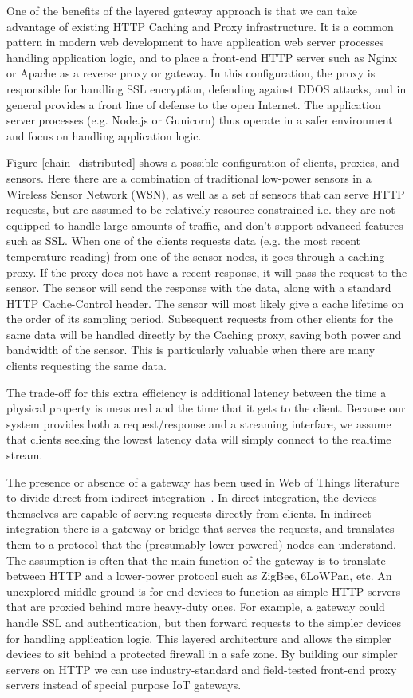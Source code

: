 \documentclass{acm_proc_article-sp}
\begin{document}
One of the benefits of the layered gateway approach is that we can take
advantage of existing HTTP Caching and Proxy infrastructure. It is a common
pattern in modern web development to have application web server processes
handling application logic, and to place a front-end HTTP server such as Nginx
or Apache as a reverse proxy or gateway.  In this configuration, the proxy is
responsible for handling SSL encryption, defending against DDOS attacks, and in
general provides a front line of defense to the open Internet. The application
server processes (e.g.  Node.js or Gunicorn) thus operate in a safer
environment and focus on handling application logic.

Figure \ref{chain_distributed} shows a possible configuration of clients,
proxies, and sensors. Here there are a combination of traditional low-power
sensors in a Wireless Sensor Network (WSN), as well as a set of sensors that
can serve HTTP requests, but are assumed to be relatively resource-constrained
i.e.  they are not equipped to handle large amounts of traffic, and don't
support advanced features such as SSL. When one of the clients requests data
(e.g. the most recent temperature reading) from one of the sensor nodes, it
goes through a caching proxy. If the proxy does not have a recent response, it
will pass the request to the sensor. The sensor will send the response with the
data, along with a standard HTTP Cache-Control header. The sensor will most
likely give a cache lifetime on the order of its sampling period. Subsequent
requests from other clients for the same data will be handled directly by the
Caching proxy, saving both power and bandwidth of the sensor. This is
particularly valuable when there are many clients requesting the same data.

The trade-off for this extra efficiency is additional latency between the time
a physical property is measured and the time that it gets to the client.
Because our system provides both a request/response and a streaming interface,
we assume that clients seeking the lowest latency data will simply connect to
the realtime stream.

The presence or absence of a gateway has been used in Web of Things literature
to divide direct from indirect integration~\cite{wotsurvey}. In direct
integration, the devices themselves are capable of serving requests directly
from clients. In indirect integration there is a gateway or bridge that serves
the requests, and translates them to a protocol that the (presumably
lower-powered) nodes can understand. The assumption is often that the main
function of the gateway is to translate between HTTP and a lower-power protocol
such as ZigBee, 6LoWPan, etc. An unexplored middle ground is for end devices to
function as simple HTTP servers that are proxied behind more heavy-duty ones.
For example, a gateway could handle SSL and authentication, but then forward
requests to the simpler devices for handling application logic. This layered
architecture  and allows the simpler devices to sit behind a protected firewall
in a safe zone. By building our simpler servers on HTTP we can use
industry-standard and field-tested front-end proxy servers instead of special
purpose IoT gateways.
\end{document}
